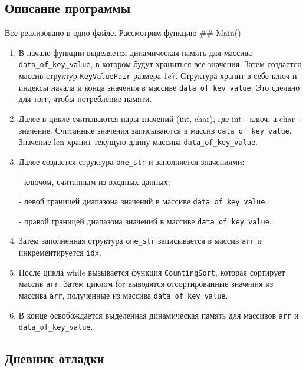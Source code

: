 \documentclass[12pt]{article}
\begin{document}
\subsection*{Описание программы}
Все реализовано в одно файле. Рассмотрим функцию ## Main()
\begin{enumerate}
\item В начале функции выделяется динамическая память для массива  \verb|data_of_key_value|, в котором будут храниться все значения. Затем создается массив структур \verb|KeyValuePair| размера 1e7. Структура хранит в себе ключ и индексы начала и конца значения в массиве \verb|data_of_key_value|. Это сделано для тогг, чтобы потребление памяти. 

\item Далее в цикле считываются пары значений (int, char), где int - ключ, а char - значение. Считанные значения записываются в массив \verb|data_of_key_value|. Значение len хранит текущую длину массива \verb|data_of_key_value|.

\item Далее создается структура \verb|one_str| и заполняется значениями:

    - ключом, считанным из входных данных;
    
    - левой границей диапазона значений в массиве \verb|data_of_key_value|;
    
    - правой границей диапазона значений в массиве \verb|data_of_key_value|.

\item Затем заполненная структура \verb|one_str| записывается в массив \verb|arr| и инкрементируется \verb|idx|.

\item После цикла while вызывается функция \verb|CountingSort|, которая сортирует массив \verb|arr|. Затем циклом for выводятся отсортированные значения из массива \verb|arr|, полученные из массива \verb|data_of_key_value|.

\item В конце освобождается выделенная динамическая память для массивов \verb|arr| и \verb|data_of_key_value|.
\end{enumerate}
\subsection*{Дневник отладки}
\end{document}
